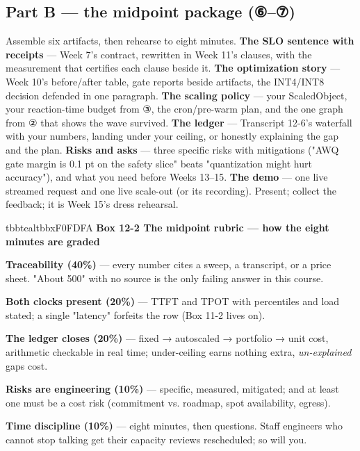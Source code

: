 \subsection*{Part B — the midpoint package (⑥–⑦)}

Assemble six artifacts, then rehearse to eight minutes. \textbf{The SLO sentence with receipts} — Week 7's contract, rewritten in Week 11's clauses, with the measurement that certifies each clause beside it. \textbf{The optimization story} — Week 10's before/after table, gate reports beside artifacts, the INT4/INT8 decision defended in one paragraph. \textbf{The scaling policy} — your ScaledObject, your reaction-time budget from ③, the cron/pre-warm plan, and the one graph from ② that shows the wave survived. \textbf{The ledger} — Transcript 12-6's waterfall with your numbers, landing under your ceiling, or honestly explaining the gap and the plan. \textbf{Risks and asks} — three specific risks with mitigations ("AWQ gate margin is 0.1 pt on the safety slice" beats "quantization might hurt accuracy"), and what you need before Weeks 13–15. \textbf{The demo} — one live streamed request and one live scale-out (or its recording). Present; collect the feedback; it is Week 15's dress rehearsal.

\begin{calloutbox}{tbbteal}{tbbxF0FDFA}
{\normalsize\bfseries\color{tbbx115E59}Box 12-2  The midpoint rubric — how the eight minutes are graded}\par\vspace{3pt}
\begin{tbbitemize}
  \item \textbf{Traceability (40\%)} — every number cites a sweep, a transcript, or a price sheet. "About 500" with no source is the only failing answer in this course.
  \item \textbf{Both clocks present (20\%)} — TTFT and TPOT with percentiles and load stated; a single "latency" forfeits the row (Box 11-2 lives on).
  \item \textbf{The ledger closes (20\%)} — fixed → autoscaled → portfolio → unit cost, arithmetic checkable in real time; under-ceiling earns nothing extra, \textit{un-explained} gaps cost.
  \item \textbf{Risks are engineering (10\%)} — specific, measured, mitigated; and at least one must be a cost risk (commitment vs. roadmap, spot availability, egress).
  \item \textbf{Time discipline (10\%)} — eight minutes, then questions. Staff engineers who cannot stop talking get their capacity reviews rescheduled; so will you.
\end{tbbitemize}
\end{calloutbox}

